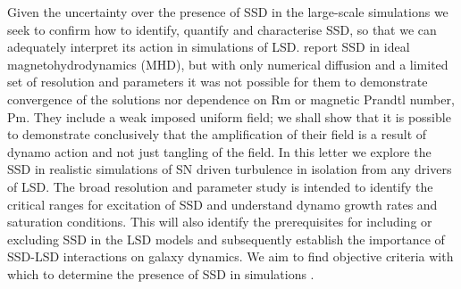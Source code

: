 \documentclass[preprint2]{aastex63}
\begin{document}
Given the uncertainty over the presence of SSD in the large-scale simulations
we seek to confirm how to identify, quantify and characterise SSD, so that we
can adequately interpret its action in simulations of LSD.
\citet{BKMM04} report SSD in ideal magnetohydrodynamics (MHD), but with only numerical diffusion and
a limited set of resolution and parameters it was not possible for them to demonstrate 
convergence of the solutions nor dependence on Rm or magnetic Prandtl number, Pm.
They include a weak imposed uniform field; we shall show that it is possible
to demonstrate conclusively that the amplification of their field is a result of
dynamo action and not just tangling of the field.
%
In this letter we explore the SSD in realistic simulations of SN driven 
turbulence
in isolation from any drivers of LSD.
%
The broad resolution and parameter study is intended to identify the critical
ranges for excitation of SSD and understand dynamo growth rates and saturation 
conditions.
This will also identify the prerequisites for including or excluding SSD in the
LSD models and subsequently establish the importance of SSD-LSD interactions 
on galaxy dynamics. 
We aim to find objective criteria with which to determine the presence of SSD in 
simulations \citep[such as][]{Gent:2013b,GE20,SDLMBP20}.

\end{document}
